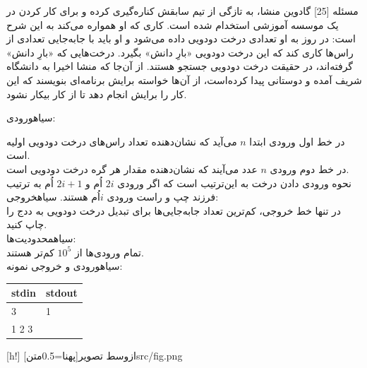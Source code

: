 ‌مسئله [25]
گادوین منشا،  به تازگی از تیم سابقش کناره‌گیری کرده و برای کار کردن در یک موسسه آموزشی استخدام شده است. کاری که او همواره می‌کند به این شرح است: در روز به او تعدادی درخت دودویی داده می‌شود و او باید با  جابه‌جایی‌ تعدادی از راس‌ها کاری کند که این درخت دودویی ‌«بارِ دانش» بگیرد. درخت‌هایی که ‌«بارِ دانش» گرفته‌اند، در حقیقت درخت دودویی جستجو هستند. از آن‌جا که منشا اخیرا به دانشگاه شریف آمده و دوستانی پیدا کرده‌است، از آن‌ها خواسته برایش برنامه‌ای بنویسند که این کار را برایش انجام دهد تا از کار بیکار نشود.

‌سیاه{ورودی:}

در خط اول ورودی ابتدا $n$ می‌آید که نشان‌دهنده تعداد راس‌های درخت دودویی اولیه است.\\
در خط دوم ورودی $n$ عدد می‌آیند که نشان‌دهنده مقدار هر گره درخت دودویی است.\\
نحوه ورودی دادن درخت به این‌ترتیب است که اگر ورودی $2i$ اُم و $2i+1$ اُم به ترتیب فرزند چپ و راست ورودی $i$اُم هستند.
‌سیاه{خروجی:}\\
در تنها خط خروجی، کم‌ترین تعداد جابه‌جایی‌ها برای تبدیل درخت دودویی به ددج را چاپ کنید.\\
‌سیاه{محدودیت‌ها:}\\
تمام ورودی‌ها از $10^5$ کم‌تر هستند.\\

‌سیاه{ورودی و خروجی نمونه:}\\
\begin{latin}
	\begin{tabularx}{\textwidth}{|X | X|}
		\hline
		\textbf{stdin} &
		\textbf{stdout}\\
		\hline
		3&
		1\\
		1 2 3&\\
		\hline
		
	\end{tabularx}
\end{latin}

[h!]
‌ازوسط
  ‌تصویر[پهنا=0.5‌متن]{src/fig.png}


